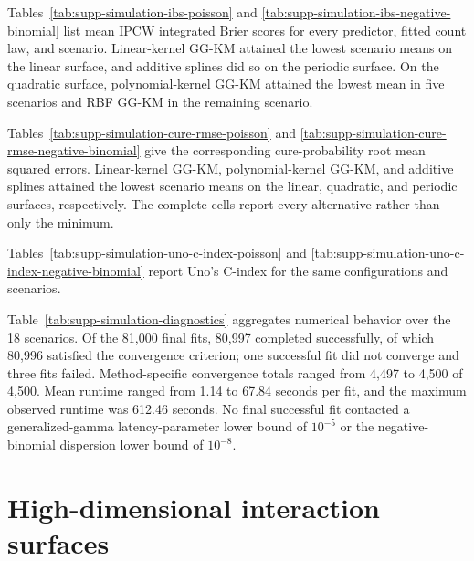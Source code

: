 \documentclass[11pt]{article}
\begin{document}
Tables~\ref{tab:supp-simulation-ibs-poisson} and \ref{tab:supp-simulation-ibs-negative-binomial} list mean IPCW integrated Brier scores for every predictor, fitted count law, and scenario. Linear-kernel GG-KM attained the lowest scenario means on the linear surface, and additive splines did so on the periodic surface. On the quadratic surface, polynomial-kernel GG-KM attained the lowest mean in five scenarios and RBF GG-KM in the remaining scenario.



Tables~\ref{tab:supp-simulation-cure-rmse-poisson} and \ref{tab:supp-simulation-cure-rmse-negative-binomial} give the corresponding cure-probability root mean squared errors. Linear-kernel GG-KM, polynomial-kernel GG-KM, and additive splines attained the lowest scenario means on the linear, quadratic, and periodic surfaces, respectively. The complete cells report every alternative rather than only the minimum.



Tables~\ref{tab:supp-simulation-uno-c-index-poisson} and \ref{tab:supp-simulation-uno-c-index-negative-binomial} report Uno's C-index for the same configurations and scenarios.



Table~\ref{tab:supp-simulation-diagnostics} aggregates numerical behavior over the 18 scenarios. Of the 81,000 final fits, 80,997 completed successfully, of which 80,996 satisfied the convergence criterion; one successful fit did not converge and three fits failed. Method-specific convergence totals ranged from 4,497 to 4,500 of 4,500. Mean runtime ranged from 1.14 to 67.84 seconds per fit, and the maximum observed runtime was 612.46 seconds. No final successful fit contacted a generalized-gamma latency-parameter lower bound of $10^{-5}$ or the negative-binomial dispersion lower bound of $10^{-8}$.



\section{High-dimensional interaction surfaces}\label{sec:supp-highdim-simulation}
\end{document}
